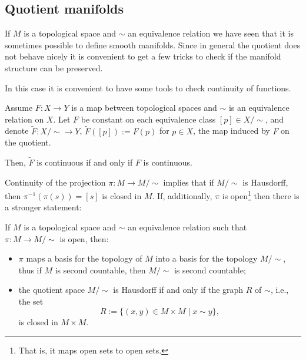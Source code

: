 \subsection{Quotient manifolds}

If $M$ is a topological space and $\sim$ an equivalence relation we have seen that it is sometimes possible to define smooth manifolds.
Since in general the quotient does not behave nicely it is convenient to get a few tricks to check if the manifold structure can be preserved.

In this case it is convenient to have some tools to check continuity of functions.

\begin{proposition}
  Assume $F:X\to Y$ is a map between topological spaces and $\sim$ is an equivalence relation on $X$.
  Let $F$ be constant on each equivalence class $[p]\in X/\!\sim$, and denote $\widetilde F:X/\!\sim\to Y$, $\widetilde F([p]) := F(p)$ for $p\in X$, the map induced by $F$ on the quotient.

  Then, $\widetilde F$ is continuous if and only if $F$ is continuous.
\end{proposition}

Continuity of the projection $\pi: M \to M/\!\sim$ implies that if $M/\!\sim$ is Hausdorff, then $\pi^{-1}(\pi(s)) = [s]$ is closed in $M$.
If, additionally, $\pi$ is open\footnote{That is, it maps open sets to open sets.} then there is a stronger statement:
\begin{theorem}\label{thm:openproj}
  If $M$ is a topological space and $\sim$ an equivalence relation such that $\pi:M \to M/\!\sim$ is open, then:
  \begin{itemize}
    \item $\pi$ maps a basis for the topology of $M$ into a basis for the topology $M/\!\sim$, thus if $M$ is second countable, then $M/\!\sim$ is second countable;
    \item the quotient space $M/\!\sim$ is Hausdorff if and only if the graph $R$ of $\sim$, i.e., the set
          \begin{equation}
            R := \{(x,y)\in M\times M \mid x\sim y\},
          \end{equation}
          is closed in $M\times M$.
  \end{itemize}
\end{theorem}

